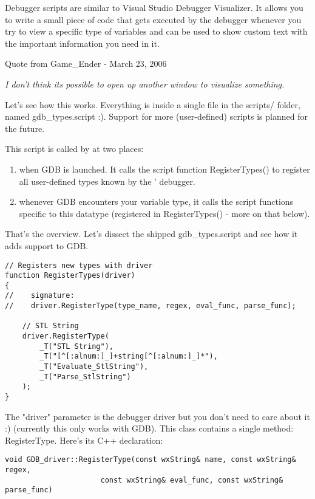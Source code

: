 Debugger scripts are similar to Visual Studio Debugger Visualizer. It allows you to write a small piece of code that gets executed by the debugger whenever you try to view a specific type of variables and can be used to show custom text with the important information you need in it.

Quote from Game\_Ender - March 23, 2006

\textit{I don't think its possible to open up another window to visualize something.}

Let's see how this works. Everything is inside a single file in the scripts/ folder, named gdb\_types.script :). Support for more (user-defined) scripts is planned for the future.


This script is called by \codeblocks at two places:
\begin{enumerate}
\item when GDB is launched. It calls the script function RegisterTypes() to register all user-defined types known by the \codeblocks' debugger.
\item whenever GDB encounters your variable type, it calls the script functions specific to this datatype (registered in RegisterTypes() - more on that below).
\end{enumerate}

That's the overview. Let's dissect the shipped gdb\_types.script and see how it adds  support to GDB.

\begin{lstlisting}
// Registers new types with driver
function RegisterTypes(driver)
{
//    signature:
//    driver.RegisterType(type_name, regex, eval_func, parse_func); 

    // STL String
    driver.RegisterType(
        _T("STL String"),
        _T("[^[:alnum:]_]+string[^[:alnum:]_]*"),
        _T("Evaluate_StlString"),
        _T("Parse_StlString")
    );
}
\end{lstlisting}

The "driver" parameter is the debugger driver but you don't need to care about it :) (currently this only works with GDB). This class contains a single method: RegisterType. Here's its C++ declaration:

\begin{lstlisting}
void GDB_driver::RegisterType(const wxString& name, const wxString& regex, 
                      const wxString& eval_func, const wxString& parse_func)
\end{lstlisting}


